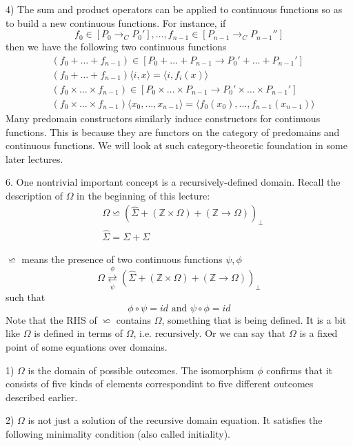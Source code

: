 \documentclass{report}[12pt]
\begin{document}
4) The sum and product operators can be applied to continuous functions so as to build a new continuous functions. For instance, if
\[f_0 \in [P_0 \rightarrow_C P_0'], \ldots, f_{n-1} \in [P_{n-1} \rightarrow_C P_{n-1}'']\]
then we have the following two continuous functions
\begin{align*}
  &(f_0 + \ldots + f_{n-1}) \in [P_0 + \ldots + P_{n-1} \rightarrow P_0' + \ldots + P_{n-1}'] \\
  &(f_0 + \ldots + f_{n-1}) \langle i, x \rangle = \langle i, f_i(x) \rangle \\
  &(f_0 \times \ldots \times f_{n-1}) \in [P_0 \times \ldots \times P_{n-1} \rightarrow P_0' \times \ldots \times P_{n-1}'] \\
  &(f_0 \times \ldots \times f_{n-1}) \langle x_0, \ldots, x_{n-1} \rangle = \langle f_0(x_0), \ldots, f_{n-1} (x_{n-1}) \rangle
\end{align*}
Many predomain constructors similarly induce constructors for continuous functions. This is because they are functors on  the category of predomains and continuous functions. We will look at such category-theoretic foundation in some later lectures.

6. One nontrivial important concept is a recursively-defined domain. Recall the description of $\Omega$ in the beginning of this lecture:
\begin{align*}
  &\Omega \backsimeq (\hat \Sigma + (\mathbb{Z} \times \Omega) + (\mathbb{Z}\rightarrow \Omega))_\bot \\
  &\hat \Sigma = \Sigma + \Sigma
\end{align*}

$\backsimeq$ means the presence of two continuous functions $\psi, \phi$
\[\Omega \underset{\psi}{\overset{\phi}{\rightleftarrows}} (\hat \Sigma + (\mathbb{Z} \times \Omega) + (\mathbb{Z} \rightarrow \Omega))_\bot\]
such that
\[\phi \circ \psi = id \text{ and } \psi \circ \phi = id\]
Note that the RHS of $\backsimeq$ contains $\Omega$, something that is being defined. It is a bit like $\Omega$ is defined in terms of $\Omega$, i.e. recursively. Or we can say that $\Omega$ is a fixed point of some equations over domains.

1) $\Omega$ is the domain of possible outcomes. The isomorphism $\phi$ confirms that it consists of five kinds of elements correspondint to five different outcomes described earlier.

2) $\Omega$ is not just a solution of the recursive domain equation. It satisfies the following minimality condition (also called initiality).
\end{document}
